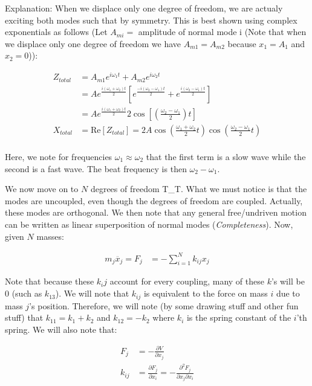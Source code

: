 \documentclass{report}
\begin{document}
Explanation: When we displace only one degree of freedom, we are actualy exciting both modes such that by symmetry. This is best shown using complex exponentials as follows (Let $A_{mi} =$ amplitude of normal mode i (Note that when we displace only one degree of freedom we have $A_{m1} = A_{m2}$ because $x_1 = A_1$ and $x_2 = 0$)):

\begin{align*}
Z_{total} &= A_{m1}e^{i\omega_1 t} + A_{m2}e^{i\omega_2t}\\
&= Ae^{\frac{i(\omega_1 + \omega_2)t}{2}}\left[ e^{\frac{-i(\omega_2 - \omega_1)t}{2}} + e^{\frac{i(\omega_2 - \omega_1)t}{2}}\right]\\
&=  Ae^{\frac{i(\omega_1 + \omega_2)t}{2}} 2 \cos\left[\left(\frac{\omega_2 - \omega_1}{2}\right)t\right]\\
X_{total} &= \mathrm{Re}[Z_{total}] = 2A\cos\left(\frac{\omega_1 + \omega_2}{2}t\right)\cos\left(\frac{\omega_2 - \omega_1}{2}t\right)\\
\end{align*}

Here, we note for frequencies $\omega_1 \approx \omega_2$ that the first term is a slow wave while the second is a fast wave. The beat frequency is then $\omega_2 - \omega_1$.

We now move on to $N$ degrees of freedom T\_T. What we must notice is that the modes are uncoupled, even though the degrees of freedom are coupled. Actually, these modes are orthogonal. We then note that any general free/undriven motion can be written as linear superposition of normal modes (\emph{Completeness}). Now, given $N$ masses:

\begin{align*}
m_j \ddot{x_j} = F_j &= -\displaystyle\sum\limits_{i=1}^N k_{ij}x_j
\end{align*}

Note that because these $k_ij$ account for every coupling, many of these $k$'s will be $0$ (such as $k_{13}$). We will note that $k_{ij}$ is equivalent to the force on mass $i$ due to mass $j$'s position. Therefore, we will note (by some drawing stuff and other fun stuff) that $k_{11} = k_1 + k_2$ and $k_{12} = -k_2$ where $k_i$ is the spring constant of the $i$'th spring. We will also note that:

\begin{align*}
F_j &= -\frac{\partial V}{\partial x_j}\\
k_{ij} &= \frac{\partial F_j}{\partial x_i} = - \frac{\partial^2 F_j}{\partial x_j \partial x_i}
\end{align*}
\end{document}
